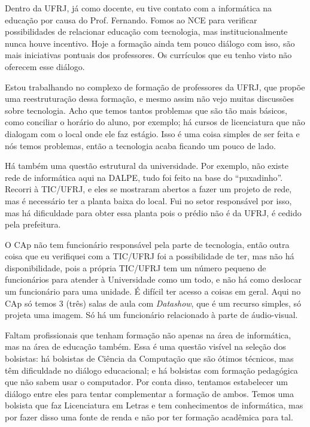 Dentro da UFRJ, já como docente, eu tive contato com a informática na educação por causa do Prof. Fernando. Fomos ao NCE para verificar possibilidades de relacionar educação com tecnologia, mas institucionalmente nunca houve incentivo. Hoje a formação ainda tem pouco diálogo com isso, são mais iniciativas pontuais dos professores. Os currículos que eu tenho visto não oferecem esse diálogo.

Estou trabalhando no complexo de formação de professores da UFRJ, que propõe uma reestruturação dessa formação, e mesmo assim não vejo muitas discussões sobre tecnologia. Acho que temos tantos problemas que são tão mais básicos, como conciliar o horário do aluno, por exemplo; há cursos de licenciatura que não dialogam com o local onde ele faz estágio. Isso é uma coisa simples de ser feita e nós temos problemas, então a tecnologia acaba ficando um pouco de lado.

Há também uma questão estrutural da universidade. Por exemplo, não existe rede de informática aqui na DALPE, tudo foi feito na base do “puxadinho”. Recorri à TIC/UFRJ, e eles se mostraram abertos a fazer um projeto de rede, mas é necessário ter a planta baixa do local. Fui no setor responsável por isso, mas há dificuldade para obter essa planta pois o prédio não é da UFRJ, é cedido pela prefeitura.

O CAp não tem funcionário responsável pela parte de tecnologia, então outra coisa que eu verifiquei com a TIC/UFRJ foi a possibilidade de ter, mas não há disponibilidade, pois a própria TIC/UFRJ tem um número pequeno de funcionários para atender à Universidade como um todo, e não há como deslocar um funcionário para uma unidade. É difícil ter acesso a coisas em geral. Aqui no CAp só temos 3 (três) salas de aula com \textit{Datashow}, que é um recurso simples, só projeta uma imagem. Só há um funcionário relacionado à parte de áudio-visual.

Faltam profissionais que tenham formação não apenas na área de informática, mas na área de educação também. Essa é uma questão visível na seleção dos bolsistas: há bolsistas de Ciência da Computação que são ótimos técnicos, mas têm dificuldade no diálogo educacional; e há bolsistas com formação pedagógica que não sabem usar o computador. Por conta disso, tentamos estabelecer um diálogo entre eles para tentar complementar a formação de ambos. Temos uma bolsista que faz Licenciatura em Letras e tem conhecimentos de informática, mas por fazer disso uma fonte de renda e não por ter formação acadêmica para tal.

